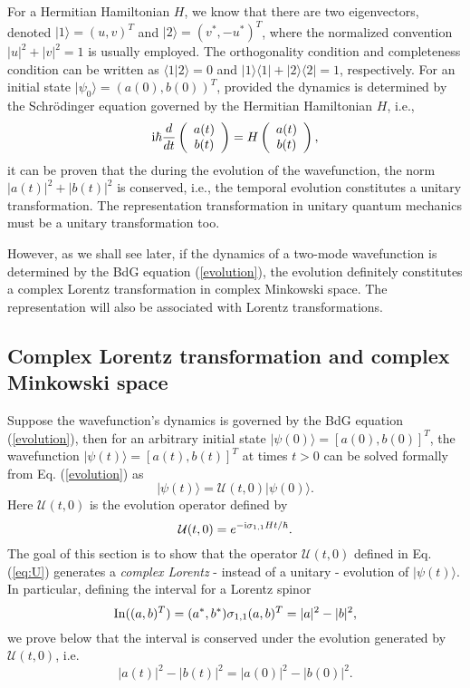 \documentclass[pra,epsfig,rotate,superscriptaddress,showpacs]{revtex4}
\def\iv{{\rm  In}}
\begin{document}
For a Hermitian Hamiltonian $H$, we know that there are two eigenvectors, denoted $|1\rangle=(u,v)^T$ and $|2\rangle=(v^*,-u^*)^T$, where the normalized convention $|u|^2+|v|^2=1$ is usually employed. The orthogonality condition and completeness condition can be written as $\langle1|2\rangle=0$ and $|1\rangle\langle1|+|2\rangle\langle2|=1$, respectively. For an initial state $|\psi_0\rangle=(a(0),b(0))^T$, provided the dynamics is determined by the Schr\"odinger equation governed by the Hermitian Hamiltonian $H$, i.e.,
\begin{equation}
{\text i}\hbar\frac{d}{dt}\left(\begin{array}{c}a(t) \\b(t)\end{array} \right)=H \left(\begin{array}{c}a(t) \\b(t)\end{array} \right),
\end{equation}
it can be proven that the during the evolution of the wavefunction, the norm $|a(t)|^2+|b(t)|^2$ is conserved, i.e., the temporal evolution constitutes a unitary transformation. The representation transformation in unitary quantum mechanics must be a unitary transformation too.

However, as we shall see later, if the dynamics of a two-mode wavefunction is determined by the BdG equation (\ref{evolution}), the evolution definitely constitutes a complex Lorentz transformation in complex Minkowski space. The representation will also be associated with Lorentz transformations.


\subsection{Complex Lorentz transformation and complex Minkowski space}

Suppose the wavefunction's dynamics is governed by the BdG equation (\ref{evolution}), then for an arbitrary initial state $|\psi(0)\rangle=[a(0),b(0)]^T$, the wavefunction $|\psi(t)\rangle=[a(t),b(t)]^T$ at times $t>0$ can be solved formally from Eq. (\ref{evolution}) as
\begin{equation}\label{Eq:psit}
|\psi(t)\rangle=\mathcal{U}(t,0)|\psi(0)\rangle.
\end{equation}
Here $\mathcal{U}(t,0)$ is the evolution operator defined by
\begin{equation}\label{eq:U}
\mathcal{U}(t,0)=e^{-{\text i}\sigma_{1,1}Ht/\hbar}.
\end{equation}
The goal of this section is to show that the operator $\mathcal{U}(t,0)$ defined in Eq. (\ref{eq:U}) generates a \textit{complex Lorentz} - instead of a unitary - evolution of $|\psi(t)\rangle$.  In particular, defining the interval for a Lorentz spinor
\begin{equation}
\iv((a,b)^T)=(a^*,b^*)\sigma_{1,1}(a,b)^T=|a|^2-|b|^2,
\end{equation}
we prove below that the interval is conserved under the evolution generated by $\mathcal{U}(t,0)$, i.e.
\begin{equation}\label{eq:interval}
|a(t)|^2-|b(t)|^2=|a(0)|^2-|b(0)|^2.
\end{equation}
\end{document}
